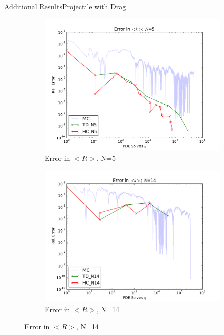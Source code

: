 \documentclass{beamer}
\begin{document}
\begin{frame}{Additional Results}{Projectile with Drag}
  \begin{figure}[h!]
    \centering
    \begin{subfigure}[b]{0.49 \textwidth}
      \includegraphics[width=\textwidth]{../graphics/err_5}
      \caption{Error in $<R>$, N=5}
      \label{err_5}
    \end{subfigure}
    \begin{subfigure}[b]{0.49 \textwidth}
      \includegraphics[width=\textwidth]{../graphics/err_14}
      \caption{Error in $<R>$, N=14}
      \label{err_14}
    \end{subfigure}
  \end{figure}
\end{frame}
\end{document}
